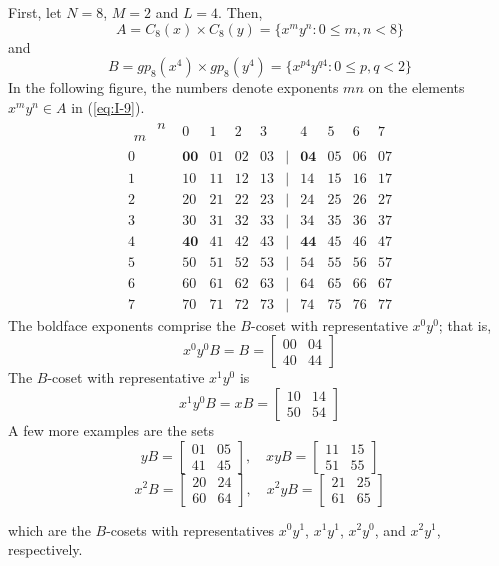 \begin{example}
First, let $N=8$, $M=2$ and $L=4$.  Then,
\begin{equation}\label{eq:I-9}
A = C_8(x) \times C_8(y) = \{x^m y^n : 0 \leq m,n < 8 \}
\end{equation}
and
\[
B = gp_8(x^4) \times gp_8(y^4) = \{x^{p4} y^{q4} : 0 \leq p,q < 2 \}
\]
In the following figure, the numbers denote exponents $mn$ on the
elements $x^my^n \in A$ in (\ref{eq:I-9}). 
\[
\begin{matrix}  
\begin{array}{cc} & n\\
                m & \end{array} & 0 & 1 & 2 & 3 &  & 4 & 5 & 6 & 7\\
0 & \mathbf{00} & 01 & 02 & 03 & | & \mathbf{04} & 05 & 06 & 07\\
1 & 10 & 11 & 12 & 13 & | & 14 & 15 & 16 & 17\\
2 & 20 & 21 & 22 & 23 & | & 24 & 25 & 26 & 27\\
3 & 30 & 31 & 32 & 33 & | & 34 & 35 & 36 & 37\\
\hline
4 & \mathbf{40} & 41 & 42 & 43 & | & \mathbf{44} & 45 & 46 & 47\\
5 & 50 & 51 & 52 & 53 & | & 54 & 55 & 56 & 57\\
6 & 60 & 61 & 62 & 63 & | & 64 & 65 & 66 & 67\\
7 & 70 & 71 & 72 & 73 & | & 74 & 75 & 76 & 77
\end{matrix}\]
The boldface exponents comprise the $B$-coset with representative
$x^0y^0$; that is,
\[
x^0y^0B = B = \begin{bmatrix} 00 & 04 \\ 40 & 44 \end{bmatrix}
\]
The $B$-coset with representative $x^1y^0$ is 
\[
x^1y^0B = xB = \begin{bmatrix}10 & 14 \\ 50 & 54 \end{bmatrix}
\]
A few more examples are the sets
\[
yB = \begin{bmatrix} 01 & 05 \\ 41 & 45 \end{bmatrix}, \quad
xyB = \begin{bmatrix} 11 & 15 \\ 51 & 55 \end{bmatrix}
\]
\[
x^2B = \begin{bmatrix} 20 & 24 \\ 60 & 64 \end{bmatrix}, \quad
x^2yB = \begin{bmatrix} 21 & 25 \\ 61 & 65 \end{bmatrix}
\]
\end{example}
which are the $B$-cosets with representatives $x^0y^1$,
$x^1y^1$, $x^2y^0$, and $x^2y^1$, respectively.

